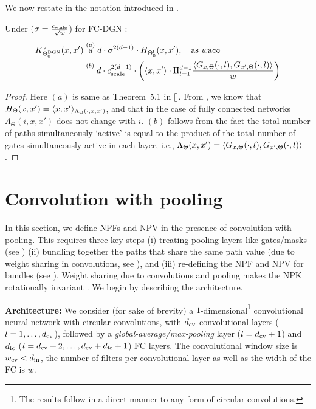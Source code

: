 We now restate  in the notation introduced in .
\begin{theorem} Under   ($\sigma=\frac{c_{\text{scale}}}{\sqrt{w}}$) for FC-DGN : 
\begin{align*}
K^{\text{v}}_{\Theta^{\text{DGN}}_0}(x,x') &\stackrel{(a)}{{\textnormal{a}}} d\cdot \sigma^{2(d-1)} \cdot H_{\Theta^{\textrm{f}}_0}(x,x'), \quad\text{as}\,\, w{\textnormal{a}}\infty \\
&\stackrel{(b)}{=} d\cdot c_{\text{scale}}^{2(d-1)} \cdot \left(\langle  x,x'\rangle \cdot \Pi_{l=1}^{d-1} \frac{\langle G_{x,\Theta}(\cdot,l), G_{x',\Theta}(\cdot,l)\rangle}w\right)
\end{align*}
\end{theorem} 

\begin{proof}
Here $(a)$ is same as Theorem~5.1 in []. From , we know that $H_{\Theta}(x,x')=\langle x,x'\rangle_{\Lambda_{\Theta}(\cdot,x,x')}$, and that in the case of fully connected networks $\Lambda_{\Theta}(i,x,x')$ does not change with $i$. $(b)$ follows from the fact the total number of paths simultaneously `active' is equal to the product of the total number of gates simultaneously active in each layer, i.e., $\Lambda_{\Theta}(x,x')=\langle G_{x,\Theta}(\cdot,l), G_{x',\Theta}(\cdot,l)\rangle$. 
\end{proof}

\section{Convolution with pooling}
In this section, we define NPFs and NPV in the presence of convolution with pooling. This requires three key steps (i) treating pooling layers like gates/masks (see ) (ii) bundling together the paths that share the same path value
(due to weight sharing in convolutions, see ),  and (iii) re-defining the NPF and NPV for bundles (see ). Weight sharing due to convolutions and pooling makes the NPK rotationally invariant . We begin by describing the architecture.

\textbf{Architecture:} We consider (for sake of brevity) a $1$-dimensional\footnote{The results follow in a direct manner to any form of circular convolutions.} convolutional neural network with circular convolutions, with $d_{\text{cv}}$ convolutional layers ($l=1,\ldots,d_{\text{cv}}$), followed by a \emph{global-average/max-pooling} layer ($l=d_{\text{cv}}+1$) and $d_{\text{fc}}$ ($l=d_{\text{cv}}+2,\ldots,d_{\text{cv}}+d_{\text{fc}}+1$) FC  layers. The convolutional window size is $w_{\text{cv}}<d_{\text{in}}$, the number of filters per convolutional layer as well as the width of the FC is $w$. 

